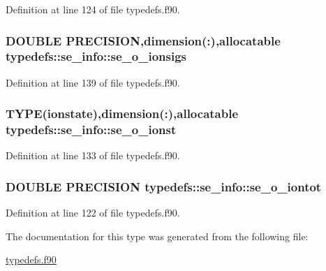 Definition at line 124 of file typedefs.f90.\hypertarget{typetypedefs_1_1se__info_adace414a14734324000a3b05920e1c3d}{
\subsubsection[{se\_\-o\_\-ionsigs}]{\setlength{\rightskip}{0pt plus 5cm}DOUBLE PRECISION,dimension(:),allocatable {\bf typedefs::se\_\-info::se\_\-o\_\-ionsigs}}}
\label{typetypedefs_1_1se__info_adace414a14734324000a3b05920e1c3d}


Definition at line 139 of file typedefs.f90.\hypertarget{typetypedefs_1_1se__info_abba4b9ad7d6f0faa147726c8a41903d0}{
\subsubsection[{se\_\-o\_\-ionst}]{\setlength{\rightskip}{0pt plus 5cm}TYPE({\bf ionstate}),dimension(:),allocatable {\bf typedefs::se\_\-info::se\_\-o\_\-ionst}}}
\label{typetypedefs_1_1se__info_abba4b9ad7d6f0faa147726c8a41903d0}


Definition at line 133 of file typedefs.f90.\hypertarget{typetypedefs_1_1se__info_ab88b1c65d29fd5dd0e82f1fcf0365a34}{
\subsubsection[{se\_\-o\_\-iontot}]{\setlength{\rightskip}{0pt plus 5cm}DOUBLE PRECISION {\bf typedefs::se\_\-info::se\_\-o\_\-iontot}}}
\label{typetypedefs_1_1se__info_ab88b1c65d29fd5dd0e82f1fcf0365a34}


Definition at line 122 of file typedefs.f90.

The documentation for this type was generated from the following file:\begin{DoxyCompactItemize}
\item 
\hyperlink{typedefs_8f90}{typedefs.f90}\end{DoxyCompactItemize}
